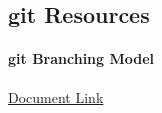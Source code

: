
\subsection{git Resources}
\paragraph{git Branching Model}
\href{../../documentation/readingRoom/versionControlResources/Git-branching-model.pdf}{Document Link}

